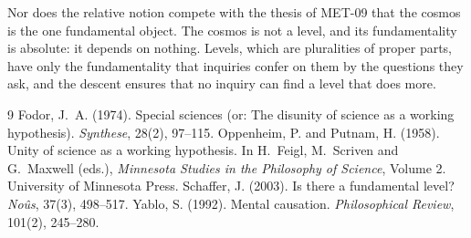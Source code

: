 \documentclass{situationist-preprint}
\begin{document}
Nor does the relative notion compete with the thesis of MET-09 that the cosmos is the one fundamental object. The cosmos is not a level, and its fundamentality is absolute: it depends on nothing. Levels, which are pluralities of proper parts, have only the fundamentality that inquiries confer on them by the questions they ask, and the descent ensures that no inquiry can find a level that does more.

\begin{thebibliography}{9}\small
{} Fodor, J.~A. (1974). Special sciences (or: The disunity of science as a working hypothesis). \emph{Synthese}, 28(2), 97--115.
 Oppenheim, P. and Putnam, H. (1958). Unity of science as a working hypothesis. In H.~Feigl, M.~Scriven and G.~Maxwell (eds.), \emph{Minnesota Studies in the Philosophy of Science}, Volume 2. University of Minnesota Press.
 Schaffer, J. (2003). Is there a fundamental level? \emph{No\^us}, 37(3), 498--517.
 Yablo, S. (1992). Mental causation. \emph{Philosophical Review}, 101(2), 245--280.
\end{thebibliography}
\end{document}
